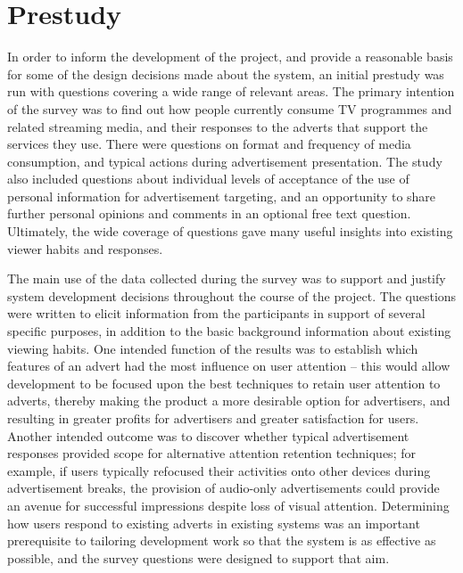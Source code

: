 \section{Prestudy}
\label{sec:prestudy}
In order to inform the development of the project, and provide a reasonable basis for some of the design decisions made about the system, an initial prestudy was run with questions covering a wide range of relevant areas.
The primary intention of the survey was to find out how people currently consume TV programmes and related streaming media, and their responses to the adverts that support the services they use.
There were questions on format and frequency of media consumption, and typical actions during advertisement presentation.
The study also included questions about individual levels of acceptance of the use of personal information for advertisement targeting, and an opportunity to share further personal opinions and comments in an optional free text question.
Ultimately, the wide coverage of questions gave many useful insights into existing viewer habits and responses.

The main use of the data collected during the survey was to support and justify system development decisions throughout the course of the project. 
The questions were written to elicit information from the participants in support of several specific purposes, in addition to the basic background information about existing viewing habits.
One intended function of the results was to establish which features of an advert had the most influence on user attention -- this would allow development to be focused upon the best techniques to retain user attention to adverts, thereby making the product a more desirable option for advertisers, and resulting in greater profits for advertisers and greater satisfaction for users.
Another intended outcome was to discover whether typical advertisement responses provided scope for alternative attention retention techniques; for example, if users typically refocused their activities onto other devices during advertisement breaks, the provision of audio-only advertisements could provide an avenue for successful impressions despite loss of visual attention.
Determining how users respond to existing adverts in existing systems was an important prerequisite to tailoring development work so that the system is as effective as possible, and the survey questions were designed to support that aim.


